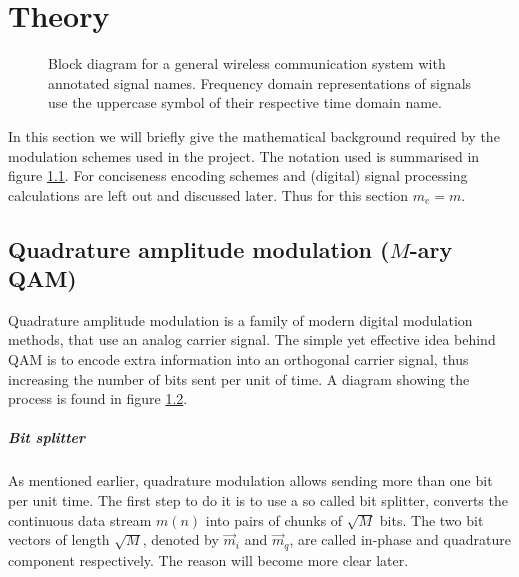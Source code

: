 
\chapter{Theory}

\begin{figure}
	\centering
	
	\caption{
		Block diagram for a general wireless communication system with annotated signal names. Frequency domain representations of signals use the uppercase symbol of their respective time domain name.
		\label{fig:notation}
	}
\end{figure}

In this section we will briefly give the mathematical background required by the modulation schemes used in the project. The notation used is summarised in figure \ref{fig:notation}. For conciseness encoding schemes and (digital) signal processing calculations are left out and discussed later. Thus for this section \(m_e = m\).


\section{Quadrature amplitude modulation (\(M\)-ary QAM)}

\begin{figure}
	\centering
	
	\caption{
		\label{fig:quadrature-modulation}
	}
\end{figure}

Quadrature amplitude modulation is a family of modern digital modulation methods, that use an analog carrier signal. The simple yet effective idea behind QAM is to encode extra information into an orthogonal carrier signal, thus increasing the number of bits sent per unit of time. A diagram showing the process is found in figure \ref{fig:quadrature-modulation}.


\paragraph{Bit splitter}

As mentioned earlier, quadrature modulation allows sending more than one bit per unit time. The first step to do it is to use a so called bit splitter, converts the continuous data stream \(m(n)\) into pairs of chunks of \(\sqrt{M}\) bits. The two bit vectors of length \(\sqrt{M}\), denoted by \(\vec{m}_i\) and \(\vec{m}_q\), are called in-phase and quadrature component respectively. The reason will become more clear later.

